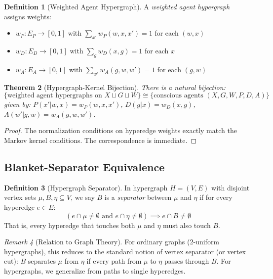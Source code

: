 \documentclass[11pt,a4paper]{article}
\theoremstyle{definition}
\newtheorem{definition}{Definition}[section]
\theoremstyle{plain}
\newtheorem{theorem}[definition]{Theorem}
\theoremstyle{remark}
\newtheorem{remark}[definition]{Remark}
\begin{document}
\begin{definition}[Weighted Agent Hypergraph]
A \emph{weighted agent hypergraph} assigns weights:
\begin{itemize}
    \item $w_P: E_P \to [0,1]$ with $\sum_{x'} w_P(w, x, x') = 1$ for each $(w, x)$
    \item $w_D: E_D \to [0,1]$ with $\sum_{g} w_D(x, g) = 1$ for each $x$
    \item $w_A: E_A \to [0,1]$ with $\sum_{w'} w_A(g, w, w') = 1$ for each $(g, w)$
\end{itemize}
\end{definition}

\begin{theorem}[Hypergraph-Kernel Bijection]\label{thm:hypergraph-kernel}
There is a natural bijection:
\[
\{ \text{weighted agent hypergraphs on } X \sqcup G \sqcup W \} \cong \{ \text{conscious agents } (X, G, W, P, D, A) \}
\]
given by: $P(x'|w,x) = w_P(w, x, x')$, $D(g|x) = w_D(x, g)$, $A(w'|g,w) = w_A(g, w, w')$.
\end{theorem}

\begin{proof}
The normalization conditions on hyperedge weights exactly match the Markov kernel conditions. The correspondence is immediate.
\end{proof}

\subsection{Blanket-Separator Equivalence}

\begin{definition}[Hypergraph Separator]\label{def:hypergraph-separator}
In hypergraph $H = (V, E)$ with disjoint vertex sets $\mu, B, \eta \subseteq V$, we say $B$ is a \emph{separator} between $\mu$ and $\eta$ if for every hyperedge $e \in E$:
\[
(e \cap \mu \neq \emptyset \text{ and } e \cap \eta \neq \emptyset) \implies e \cap B \neq \emptyset
\]
That is, every hyperedge that touches both $\mu$ and $\eta$ must also touch $B$.
\end{definition}

\begin{remark}[Relation to Graph Theory]
For ordinary graphs (2-uniform hypergraphs), this reduces to the standard notion of vertex separator (or vertex cut): $B$ separates $\mu$ from $\eta$ if every path from $\mu$ to $\eta$ passes through $B$. For hypergraphs, we generalize from paths to single hyperedges.
\end{remark}
\end{document}
